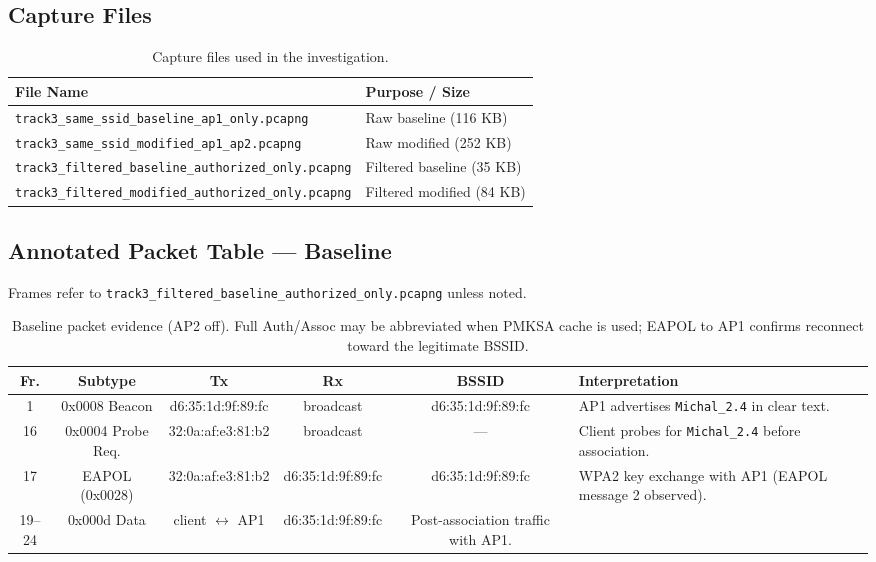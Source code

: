 \documentclass[12pt,a4paper]{article}
\begin{document}
\subsection{Capture Files}

\begin{table}[H]
\centering
\begin{tabular}{|p{6cm}|p{7cm}|}
\hline
\textbf{File Name} & \textbf{Purpose / Size} \\
\hline
\texttt{track3\_same\_ssid\_baseline\_ap1\_only.pcapng} & Raw baseline (116 KB) \\
\hline
\texttt{track3\_same\_ssid\_modified\_ap1\_ap2.pcapng} & Raw modified (252 KB) \\
\hline
\texttt{track3\_filtered\_baseline\_authorized\_only.pcapng} & Filtered baseline (35 KB) \\
\hline
\texttt{track3\_filtered\_modified\_authorized\_only.pcapng} & Filtered modified (84 KB) \\
\hline
\end{tabular}
\caption{Capture files used in the investigation.}
\end{table}

\subsection{Annotated Packet Table --- Baseline}

Frames refer to \texttt{track3\_filtered\_baseline\_authorized\_only.pcapng} unless noted.

\begin{table}[H]
\centering
\scriptsize
\renewcommand{\arraystretch}{1.3}
\begin{tabularx}{\textwidth}{|c|c|c|c|c|X|}
\hline
\textbf{Fr.} & \textbf{Subtype} & \textbf{Tx} & \textbf{Rx} & \textbf{BSSID} & \textbf{Interpretation} \\
\hline
1 & 0x0008 Beacon & d6:35:1d:9f:89:fc & broadcast & d6:35:1d:9f:89:fc & AP1 advertises \texttt{Michal\_2.4} in clear text. \\
\hline
16 & 0x0004 Probe Req. & 32:0a:af:e3:81:b2 & broadcast & --- & Client probes for \texttt{Michal\_2.4} before association. \\
\hline
17 & EAPOL (0x0028) & 32:0a:af:e3:81:b2 & d6:35:1d:9f:89:fc & d6:35:1d:9f:89:fc & WPA2 key exchange with AP1 (EAPOL message 2 observed). \\
\hline
19--24 & 0x000d Data & client $\leftrightarrow$ AP1 & d6:35:1d:9f:89:fc & Post-association traffic with AP1. \\
\hline
\end{tabularx}
\caption{Baseline packet evidence (AP2 off). Full Auth/Assoc may be abbreviated when PMKSA cache is used; EAPOL to AP1 confirms reconnect toward the legitimate BSSID.}
\end{table}
\end{document}
